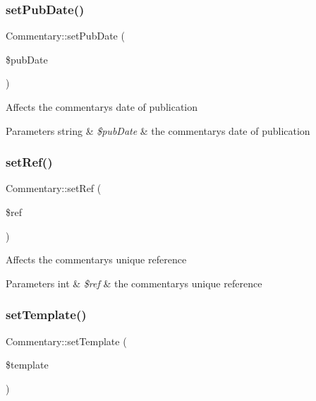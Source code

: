 \subsubsection{\texorpdfstring{set\+Pub\+Date()}{setPubDate()}}
{\footnotesize\ttfamily Commentary\+::set\+Pub\+Date (\begin{DoxyParamCaption}\item[{}]{\$pub\+Date }\end{DoxyParamCaption})}

Affects the commentary\textquotesingle{}s date of publication 
\begin{DoxyParams}[1]{Parameters}
string & {\em \$pub\+Date} & the commentary\textquotesingle{}s date of publication \\
\hline
\end{DoxyParams}
\mbox{\label{classCommentary_a280cadaa8d96b69b923f90a79dfff5c7}} 
\subsubsection{\texorpdfstring{set\+Ref()}{setRef()}}
{\footnotesize\ttfamily Commentary\+::set\+Ref (\begin{DoxyParamCaption}\item[{}]{\$ref }\end{DoxyParamCaption})}

Affects the commentary\textquotesingle{}s unique reference 
\begin{DoxyParams}[1]{Parameters}
int & {\em \$ref} & the commentary\textquotesingle{}s unique reference \\
\hline
\end{DoxyParams}
\mbox{\label{classCommentary_aa62ba556f38d8bb3e971387e84f417c8}} 
\subsubsection{\texorpdfstring{set\+Template()}{setTemplate()}}
{\footnotesize\ttfamily Commentary\+::set\+Template (\begin{DoxyParamCaption}\item[{}]{\$template }\end{DoxyParamCaption})}

